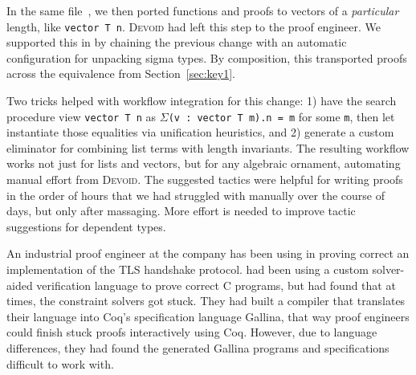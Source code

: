 In the same file~\href{https://github.com/uwplse/pumpkin-pi/blob/v2.0.0/plugin/coq/examples/Example.v}{}, we then ported functions and proofs to vectors of a \textit{particular} length, 
like \lstinline{vector T n}.
\textsc{Devoid} had left this step to the proof engineer.
We supported this in \toolname by chaining the previous change
with an automatic configuration for unpacking sigma types.
By composition, this transported proofs across the equivalence from Section~\ref{sec:key1}.

Two tricks helped with workflow integration for this change:
1) have the search procedure view \lstinline{vector T n} as 
$\Sigma$\lstinline{(v : vector T m).n = m} for some \lstinline{m},
then let \toolname instantiate those equalities via unification heuristics, %
and 2) generate a custom eliminator for combining
list terms with length invariants.
The resulting workflow works not just for lists and vectors, but for any algebraic ornament,
automating manual effort from \textsc{Devoid}.
The suggested tactics were helpful for writing proofs in the order of hours
that we had struggled with manually over the course of days, but only after massaging.
More effort is needed to improve tactic suggestions for dependent types.

An industrial proof engineer at the company \company has been using \toolname in proving
correct an implementation of the TLS handshake protocol.
\company had been using a custom solver-aided verification language to prove correct C programs,
but had found that at times, the constraint solvers got stuck.
They had built a compiler that translates their language into Coq's specification language Gallina,
that way proof engineers could finish stuck proofs interactively using Coq.
However, due to language differences, they had found the generated Gallina programs and specifications difficult to work with.

